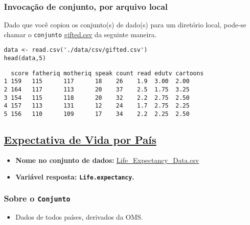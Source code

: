 \documentclass[12pt]{article}
\begin{document}
\subsubsection{Invocação de conjunto, por arquivo local}
\label{sec:orgee0313e}

Dado que você copiou os conjunto(s) de dado(s) para um diretório
local, pode-se chamar o \texttt{conjunto} \href{https://drive.google.com/file/d/1stukrpc\_Rqu-nlYZu\_-BFHNZec676\_BR/view?usp=sharing}{gifted.csv} da seguinte maneira.

\begin{verbatim}
data <- read.csv('./data/csv/gifted.csv')
head(data,5)
\end{verbatim}

\begin{verbatim}
  score fatheriq motheriq speak count read edutv cartoons
1 159   115      117      18    26    1.9  3.00  2.00    
2 164   117      113      20    37    2.5  1.75  3.25    
3 154   115      118      20    32    2.2  2.75  2.50    
4 157   113      131      12    24    1.7  2.75  2.25    
5 156   110      109      17    34    2.2  2.25  2.50    
\end{verbatim}
\clearpage

\subsection{\href{https://www.kaggle.com/augustus0498/life-expectancy-who}{Expectativa de Vida por País}}
\label{sec:org65cf3ae}
\begin{itemize}
\item \textbf{Nome no conjunto de dados:} \href{https://drive.google.com/file/d/1nUnOwgAcWIqoyG0P5\_wnlh1wPxxSUqv5/view}{Life\_Expectancy\_Data.csv}
\item \textbf{Variável resposta: \texttt{Life.expectancy}.}
\end{itemize}
\subsubsection{Sobre o \texttt{Conjunto}}
\label{sec:orgf375ba3}
\begin{itemize}
\item Dados de todos países, derivados da OMS.
\end{itemize}
\end{document}
